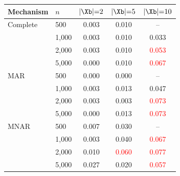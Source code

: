 \begin{tabular}{llccc}
    \toprule
    Mechanism & $n$ & $|\Xb|{=}2$ & $|\Xb|{=}5$ & $|\Xb|{=}10$ \\
    \midrule
    Complete  & 500 & 0.003 & 0.010 & -- \\
              & 1,000 & 0.003 & 0.010 & 0.033 \\
              & 2,000 & 0.003 & 0.010 & \textcolor{red}{0.053} \\
              & 5,000 & 0.000 & 0.010 & \textcolor{red}{0.067} \\
    \midrule
    MAR       & 500 & 0.000 & 0.000 & -- \\
              & 1,000 & 0.003 & 0.013 & 0.047 \\
              & 2,000 & 0.003 & 0.003 & \textcolor{red}{0.073} \\
              & 5,000 & 0.000 & 0.013 & \textcolor{red}{0.073} \\
    \midrule
    MNAR      & 500 & 0.007 & 0.030 & -- \\
              & 1,000 & 0.003 & 0.040 & \textcolor{red}{0.067} \\
              & 2,000 & 0.010 & \textcolor{red}{0.060} & \textcolor{red}{0.077} \\
              & 5,000 & 0.027 & 0.020 & \textcolor{red}{0.057} \\
    \bottomrule
\end{tabular}
